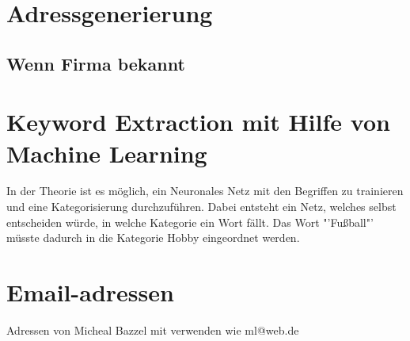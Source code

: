 \section{Adressgenerierung}
	\subsection{Wenn Firma bekannt}
\section{Keyword Extraction mit Hilfe von Machine Learning}
\label{sec:KeywordExtractionMachine Learning}
In der Theorie ist es möglich, ein Neuronales Netz mit den Begriffen zu trainieren und eine Kategorisierung durchzuführen. Dabei entsteht ein Netz, welches selbst entscheiden würde, in welche Kategorie ein Wort fällt. Das Wort "'Fußball"' müsste dadurch in die Kategorie Hobby eingeordnet werden.

\section{Email-adressen}
Adressen von Micheal Bazzel mit verwenden wie ml@web.de
